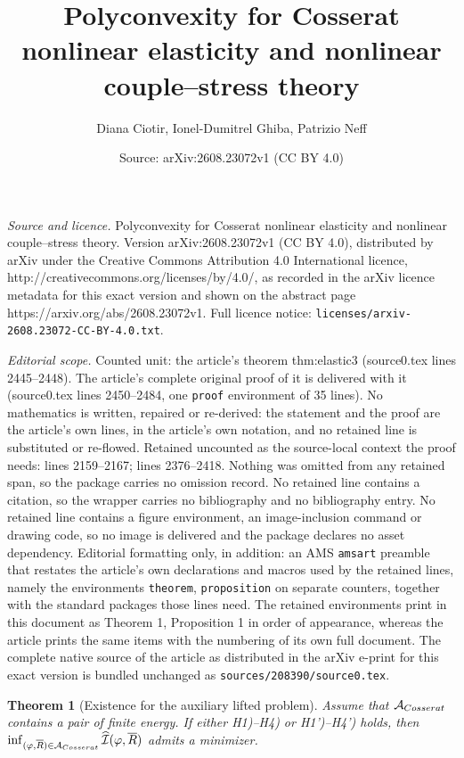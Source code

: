 \documentclass[10pt,a4paper]{amsart}
\title{Polyconvexity for Cosserat nonlinear elasticity and nonlinear couple--stress theory}
\author{Diana Ciotir, Ionel-Dumitrel Ghiba, Patrizio Neff}
\date{Source: arXiv:2608.23072v1 (CC BY 4.0)}
\newtheorem{theorem}{Theorem}
\begin{document}
\maketitle

\noindent\emph{Source and licence.} Polyconvexity for Cosserat nonlinear elasticity and nonlinear couple--stress theory. Version arXiv:2608.23072v1 (CC BY 4.0), distributed by arXiv under the Creative Commons Attribution 4.0 International licence, http://creativecommons.org/licenses/by/4.0/, as recorded in the arXiv licence metadata for this exact version and shown on the abstract page https://arxiv.org/abs/2608.23072v1. Full licence notice: \texttt{licenses/arxiv-2608.23072-CC-BY-4.0.txt}.\par\smallskip

\noindent\textit{Editorial scope.} Counted unit: the article's theorem thm:elastic3 (source0.tex lines 2445--2448). The article's complete original proof of it is delivered with it (source0.tex lines 2450--2484, one \texttt{proof} environment of 35 lines). No mathematics is written, repaired or re-derived: the statement and the proof are the article's own lines, in the article's own notation, and no retained line is substituted or re-flowed.  Retained uncounted as the source-local context the proof needs: lines 2159--2167; lines 2376--2418.  Nothing was omitted from any retained span, so the package carries no omission record.  No retained line contains a citation, so the wrapper carries no bibliography and no bibliography entry.  No retained line contains a figure environment, an image-inclusion command or drawing code, so no image is delivered and the package declares no asset dependency.  Editorial formatting only, in addition: an AMS \texttt{amsart} preamble that restates the article's own declarations and macros used by the retained lines, namely the environments \texttt{theorem}, \texttt{proposition} on separate counters, together with the standard packages those lines need.  The retained environments print in this document as Theorem 1, Proposition 1 in order of appearance, whereas the article prints the same items with the numbering of its own full document.  The complete native source of the article as distributed in the arXiv e-print for this exact version is bundled unchanged as \texttt{sources/208390/source0.tex}.
\begin{theorem}[Existence for the auxiliary lifted problem]
\label{thm:elastic2}
Assume that $\mathcal A_{\rm Cosserat}$ contains a pair of finite energy. If either H1)--H4) or H1')--H4') holds, then
$
\inf_{(\varphi, \overline R )\in\mathcal A_{\rm Cosserat}}
\widehat{\mathcal I}(\varphi, \overline R )
$
admits a minimizer.
\end{theorem}
\end{document}
